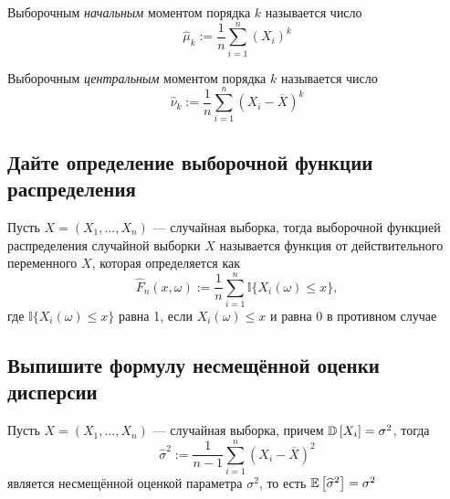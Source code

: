 \documentclass{article}
\begin{document}
 Выборочным \textit{начальным} моментом порядка $k$ называется число 
\begin{equation*}
    \widehat{\mu}_k:=\frac{1}{n}\sum_{i=1}^{n}(X_i)^k
\end{equation*}

 Выборочным \textit{центральным} моментом порядка $k$ называется число
\begin{equation*}
    \widehat{\nu}_k:=\frac{1}{n}\sum_{i=1}^{n}(X_i-\overline{X})^k
\end{equation*}



\subsection{Дайте определение выборочной функции распределения}
 Пусть $X=(X_1,\ldots,X_n)$ — случайная выборка, тогда выборочной функцией распределения случайной выборки $X$ называется функция от действительного переменного $X$, которая определяется как
\begin{equation*}
    \widehat{F}_n(x,\omega):=\frac{1}{n}\sum_{i=1}^{n}\mathbb{I}\{X_i(\omega)\leqslant x\},
\end{equation*}
где $\mathbb{I}\{X_i(\omega)\leqslant x\}$ равна 1, если $X_i(\omega)\leqslant x$ и равна 0 в противном случае


\subsection{Выпишите формулу несмещённой оценки дисперсии}
\theorem Пусть $X=(X_1,\ldots,X_n)$ — случайная выборка, причем $\mathbb{D}\left[X_i\right]=\sigma^2$, тогда 
\begin{equation*}
    \widehat{\sigma}^2:=\displaystyle\frac{1}{n-1}\sum_{i=1}^n (X_i-\overline{X})^2
\end{equation*}
является несмещённой оценкой параметра $\sigma^2$, то есть $\mathbb{E}\left[\widehat{\sigma}^2\right]=\sigma^2$
\end{document}

